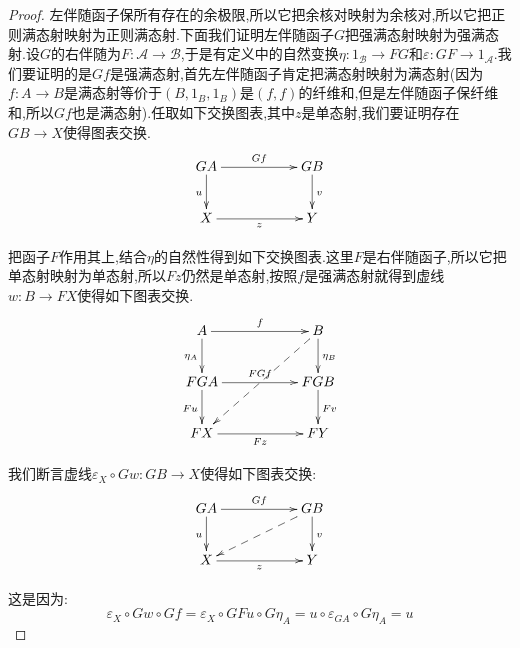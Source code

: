 \begin{enumerate}
\begin{proof}
    	左伴随函子保所有存在的余极限,所以它把余核对映射为余核对,所以它把正则满态射映射为正则满态射.下面我们证明左伴随函子$G$把强满态射映射为强满态射.设$G$的右伴随为$F:\mathscr{A}\to\mathscr{B}$,于是有定义中的自然变换$\eta:1_{\mathscr{B}}\to FG$和$\varepsilon:GF\to 1_{\mathscr{A}}$.我们要证明的是$Gf$是强满态射,首先左伴随函子肯定把满态射映射为满态射(因为$f:A\to B$是满态射等价于$(B,1_B,1_B)$是$(f,f)$的纤维和,但是左伴随函子保纤维和,所以$Gf$也是满态射).任取如下交换图表,其中$z$是单态射,我们要证明存在$GB\to X$使得图表交换.
    	$$\xymatrix{GA\ar[rr]^{Gf}\ar[d]_u&&GB\ar[d]^v\\X\ar[rr]_z&&Y}$$
    	
    	把函子$F$作用其上,结合$\eta$的自然性得到如下交换图表.这里$F$是右伴随函子,所以它把单态射映射为单态射,所以$Fz$仍然是单态射,按照$f$是强满态射就得到虚线$w:B\to FX$使得如下图表交换.
    	$$\xymatrix{A\ar[rr]^f\ar[d]_{\eta_A}&&B\ar[d]^{\eta_B}\ar@{-->}[ddll]\\FGA\ar[rr]^{FGf}\ar[d]_{Fu}&&FGB\ar[d]^{Fv}\\FX\ar[rr]_{Fz}&&FY}$$
    	
    	我们断言虚线$\varepsilon_X\circ Gw:GB\to X$使得如下图表交换:
    	$$\xymatrix{GA\ar[rr]^{Gf}\ar[d]_u&&GB\ar[d]^v\ar@{-->}[dll]\\X\ar[rr]_z&&Y}$$
    	
    	这是因为:
    	$$\varepsilon_X\circ Gw\circ Gf=\varepsilon_X\circ GFu\circ G\eta_A=u\circ\varepsilon_{GA}\circ G\eta_A=u$$
    \end{proof}
\end{enumerate}

